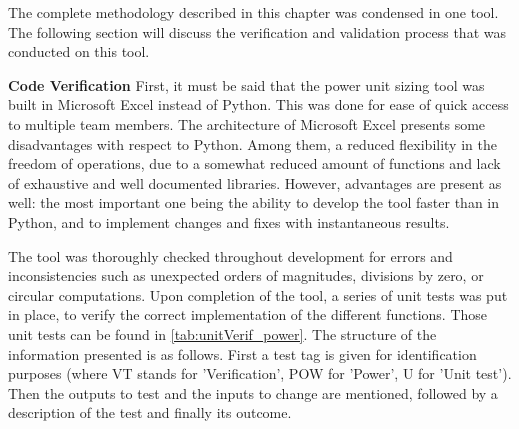 
The complete methodology described in this chapter was condensed in one tool. The following section will discuss the verification and validation process that was conducted on this tool.

\textbf{Code Verification} \newline
First, it must be said that the power unit sizing tool was built in Microsoft Excel instead of Python. This was done for ease of quick access to multiple team members. The architecture of Microsoft Excel presents some disadvantages with respect to Python. Among them, a reduced flexibility in the freedom of operations, due to a somewhat reduced amount of functions and lack of exhaustive and well documented libraries. However, advantages are present as well: the most important one being the ability to develop the tool faster than in Python, and to implement changes and fixes with instantaneous results.

The tool was thoroughly checked throughout development for errors and inconsistencies such as unexpected orders of magnitudes, divisions by zero, or circular computations. Upon completion of the tool, a series of unit tests was put in place, to verify the correct implementation of the different functions. Those unit tests can be found in \autoref{tab:unitVerif_power}. The structure of the information presented is as follows. First a test tag is given for identification purposes (where VT stands for 'Verification', POW for 'Power', U for 'Unit test'). Then the outputs to test and the inputs to change are mentioned, followed by a description of the test and finally its outcome.

